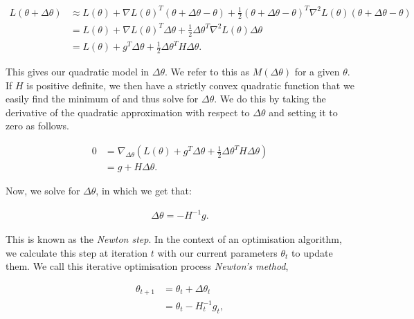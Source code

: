 \begin{align}

    L(\theta + \Delta \theta) &\approx L(\theta) + \nabla L(\theta)^T (\theta + \Delta \theta - \theta) + \frac{1}{2} (\theta + \Delta \theta - \theta)^T \nabla^2 L(\theta) (\theta + \Delta \theta - \theta) \\

    &= L(\theta) + \nabla L(\theta)^T \Delta \theta + \frac{1}{2} \Delta \theta^T \nabla^2 L(\theta) \Delta \theta \\

    &= L(\theta) + g^T \Delta \theta + \frac{1}{2} \Delta \theta^T H \Delta \theta.

\end{align}



This gives our quadratic model in $\Delta \theta$. We refer to this as $M(\Delta \theta)$ for a given $\theta$. If $H$ is positive definite, we then have a strictly convex quadratic function that we easily find the minimum of and thus solve for $\Delta \theta$. We do this by taking the derivative of the quadratic approximation with respect to $\Delta \theta$ and setting it to zero as follows.

\begin{align}

    0 &= \nabla_{\Delta \theta} \left( L(\theta) + g^T \Delta \theta + \frac{1}{2} \Delta \theta^T H \Delta \theta \right) \\

    &= g + H \Delta \theta.

\end{align}

Now, we solve for $\Delta \theta$, in which we get that:

\begin{align}

    \Delta \theta = - H^{-1} g.

\end{align} 

This is known as the \textit{Newton step}. In the context of an optimisation algorithm, we calculate this step at iteration $t$ with our current parameters $\theta_t$ to update them. We call this iterative optimisation process \textit{Newton's method},

\begin{align}

    \theta_{t+1} &= \theta_t + \Delta \theta_t \\

    &= \theta_t - H_t^{-1} g_t,

\end{align}

